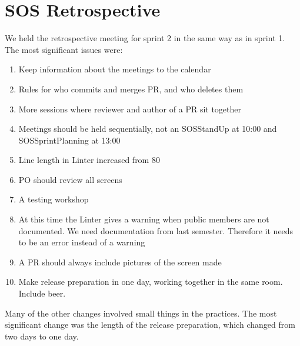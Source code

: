 \section{SOS Retrospective}

We held the retrospective meeting for sprint 2 in the same way as in sprint 1. The most significant issues were:

\begin{enumerate}
    \item Keep information about the meetings to the calendar
    \item Rules for who commits and merges \gls{PR}, and who deletes them
    \item More sessions where reviewer and author of a \gls{PR} sit together 
    \item Meetings should be held sequentially, not an \gls{SOSStandUp} at 10:00 and \gls{SOSSprintPlanning} at 13:00 
    \item Line length in Linter increased from 80    
    \item PO should review all screens
    \item A testing workshop
    \item At this time the Linter gives a warning when public members are not documented. We need documentation from last semester. Therefore it needs to be an error instead of a warning
    \item A \gls{PR} should always include pictures of the screen made
    \item Make release preparation in one day, working together in the same room. Include beer.
\end{enumerate}

Many of the other changes involved small things in the practices. The most significant change was the length of the release preparation, which changed from two days to one day.
